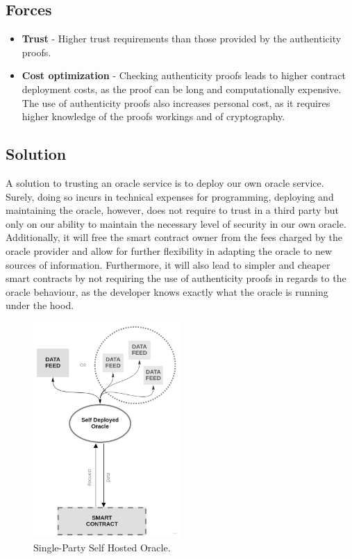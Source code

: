 \subsection{Forces}
\begin{itemize}
  \item \textbf{Trust} - Higher trust requirements than those provided by the authenticity proofs.
  \item \textbf{Cost optimization} - Checking authenticity proofs leads to higher contract deployment costs, as the proof can be long and computationally expensive. The use of authenticity proofs also increases personal cost, as it requires higher knowledge of the proofs workings and of cryptography.
\end{itemize}

\subsection{Solution}
A solution to trusting an oracle service is to deploy our own oracle service. Surely, doing so incurs in technical expenses for programming, deploying and maintaining the oracle, however, does not require to trust in a third party but only on our ability to maintain the necessary level of security in our own oracle. Additionally, it will free the smart contract owner from the fees charged by the oracle provider and allow for further flexibility in adapting the oracle to new sources of information. Furthermore, it will also lead to simpler and cheaper smart contracts by not requiring the use of authenticity proofs in regards to the oracle behaviour, as the developer knows exactly what the oracle is running under the hood.

\begin{figure}[t]
  \begin{center}
    \leavevmode
    \includegraphics[width=0.5\textwidth]{figures/oraclearch3.jpg}
    \caption{Single-Party Self Hosted Oracle.}
    \label{fig:/figures/SPSelfHostedOracle}
  \end{center}
\end{figure}


